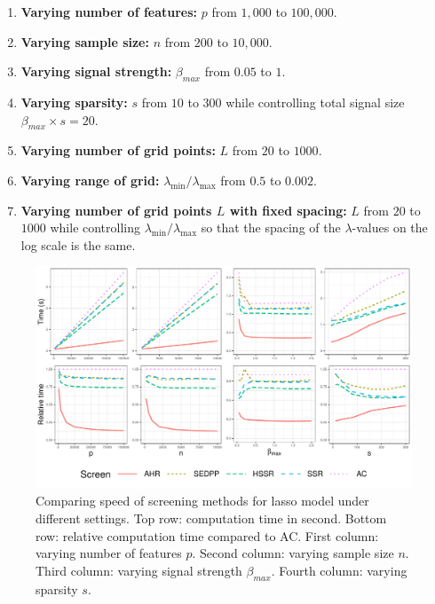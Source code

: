 \begin{enumerate}
    \item \textbf{Varying number of features:} $p$ from $1,000$ to $100,000$.
    \item \textbf{Varying sample size:} $n$ from $200$ to $10,000$.
    \item \textbf{Varying signal strength:} $\beta_{max}$ from $0.05$ to $1$.
    \item \textbf{Varying sparsity:} $s$ from $10$ to $300$ while controlling total signal size $\beta_{max}\times s=20$.
    \item \textbf{Varying number of grid points:}  $L$ from $20$ to $1000$.
    \item \textbf{Varying range of grid:}  $\lambda_{\min}/\lambda_{\max}$ from $0.5$ to $0.002$.
    \item \textbf{Varying number of grid points $L$ with fixed spacing:} $L$ from $20$ to $1000$ while controlling $\lambda_{\min}/\lambda_{\max}$ so that the spacing of the $\lambda$-values on the log scale is the same.
\end{enumerate}

\begin{figure}[h]
    \centering
    \includegraphics[scale = 0.59]{plots/511.pdf}    \caption{Comparing speed of screening methods for lasso model under different settings. Top row: computation time in second. Bottom row: relative computation time compared to AC. First column: varying number of features $p$. Second column: varying sample size $n$. Third column: varying signal strength $\beta_{max}$. Fourth column: varying sparsity $s$.}
    \label{fig:5.1.1a}
\end{figure}

